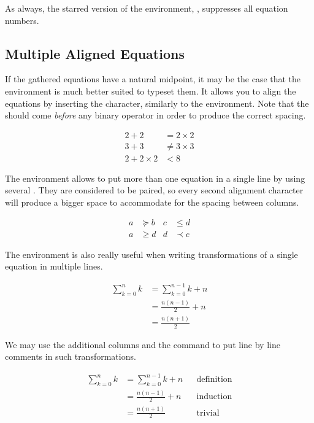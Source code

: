 As always, the starred version of the environment, , suppresses
all equation numbers.

\subsection{Multiple Aligned Equations}\label{sec:aligned_equations}

If the gathered equations have a natural midpoint, it may be the case that the
 environment is much better suited to typeset them. It allows you to
align the equations by inserting the \ai{\&} character, similarly to the
 environment. Note that the \ai{\&} should come \emph{before} any
binary operator in order to produce the correct spacing.
\begin{example}
\begin{align}
  2 + 2 & = 2 \times 2 \\
  3 + 3 & \neq 3 \times 3 \\
  2 + 2 \times 2 & < 8
\end{align}
\end{example}

The environment allows to put more than one equation in a single line by
using several \ai{\&}. They are considered to be paired, so every second
alignment character will produce a bigger space to accommodate for the spacing
between columns.
\begin{example}
\begin{align}
  a & \succeq b & c & \leq d \\
  a & \geq d & d & \prec c
\end{align}
\end{example}

The  environment is also really useful when writing transformations of
a single equation in multiple lines.
\begin{example}
\begin{align}
  \sum_{k=0}^n k 
    &= \sum_{k=0}^{n-1} k + n \\
    &= \frac{n(n-1)}{2} + n \\
    &= \frac{n(n+1)}{2}
\end{align}
\end{example}
We may use the additional columns and the  command to put line by
line comments in such transformations.
\begin{example}
\begin{align*}
  \sum_{k=0}^n k
    &= \sum_{k=0}^{n-1} k + n
      && \text{definition} \\
    &= \frac{n(n - 1)}{2} + n
      && \text{induction} \\
    &= \frac{n(n + 1)}{2}
      && \text{trivial}
\end{align*}
\end{example}

